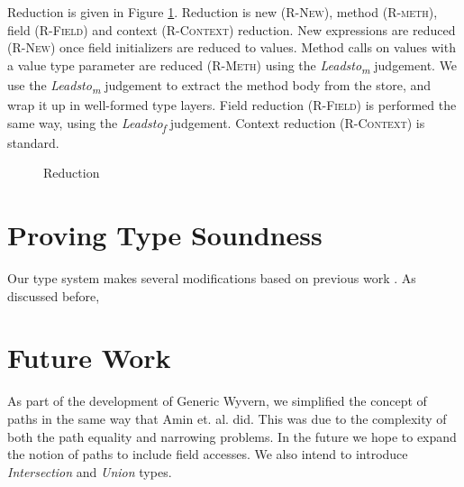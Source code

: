 \documentclass[a4paper,UKenglish]{lipics}
\begin{document}
Reduction is given in Figure \ref{f:red}. Reduction is new (\textsc{R-New}), method (\textsc{R-meth}), field (\textsc{R-Field}) and context (\textsc{R-Context}) reduction. New expressions are reduced (\textsc{R-New}) once field initializers are reduced to values. Method calls on values with a value type parameter are reduced (\textsc{R-Meth}) using the \emph{Leadsto\textsubscript{m}} judgement. We use the \emph{Leadsto\textsubscript{m}} judgement to extract the method body from the store, and wrap it up in well-formed type layers. Field reduction (\textsc{R-Field}) is performed the same way, using the \emph{Leadsto\textsubscript{f}} judgement. Context reduction (\textsc{R-Context}) is standard.
\begin{figure}[h]
\hfill {}
\caption{Reduction}
\label{f:red}
\end{figure}

\section{Proving Type Soundness}
Our type system makes several modifications based on previous work \cite{Scala stuff}. As discussed before, 

\section{Future Work}
As part of the development of Generic Wyvern, we simplified the concept of paths in the same way that Amin et. al. \cite{Amin 2014} did. This was due to the complexity of both the path equality and narrowing problems. In the future we hope to expand the notion of paths to include field accesses. We also intend to introduce \emph{Intersection} and \emph{Union} types. 
\end{document}
